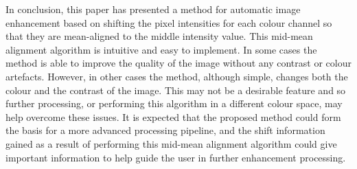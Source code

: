 \documentclass[journal,transmag]{IEEEtran}
\begin{document}
In conclusion, this paper has presented a method for automatic image enhancement based on shifting the pixel intensities for each colour channel so that they are mean-aligned to the middle intensity value.  This mid-mean alignment algorithm is intuitive and easy to implement.  In some cases the method is able to improve the quality of the image without any contrast or colour artefacts.  However, in other cases the method, although simple, changes both the colour and the contrast of the image.  This may not be a desirable feature and so further processing, or performing this algorithm in a different colour space, may help overcome these issues.  It is expected that the proposed method could form the basis for a more advanced processing pipeline, and the shift information gained as a result of performing this mid-mean alignment algorithm could give important information to help guide the user in further enhancement processing.





\end{document}
